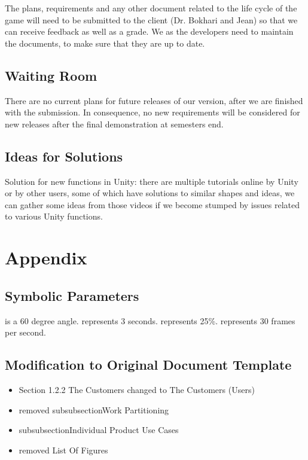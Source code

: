 \documentclass[12pt, titlepage]{article}
\begin{document}
The plans, requirements and any other document related to the life cycle of the game will need to be submitted to the client (Dr. Bokhari and Jean) so that we can receive feedback as well as a grade. We as the developers need to maintain the documents, to make sure that they are up to date.


\subsection{Waiting Room}
There are no current plans for future releases of our version, after we are finished with the submission. In consequence, no new requirements will be considered for new releases after the final demonstration at semesters end. 

\subsection{Ideas for Solutions} 
Solution for new functions in Unity: there are multiple tutorials online by Unity or by other users, some of which have solutions to similar shapes and ideas, we can gather some ideas from those videos if we become stumped by issues related to various Unity functions. 



\newpage
\section{Appendix}

\subsection{Symbolic Parameters}
\noindent \textepsilon \space is a 60 degree angle. 
\newline
\textdelta  \space represents 3 seconds.
\newline
\textalpha \space  represents 25\%.
\newline
\textgamma \space represents 30 frames per second.



\subsection{Modification to Original Document Template}
\begin{itemize}
\item Section 1.2.2 The Customers changed to The Customers (Users)
\item removed subsubsection{Work Partitioning}
\item subsubsection{Individual Product Use Cases}
\item removed List Of Figures
\end{itemize}
\end{document}
